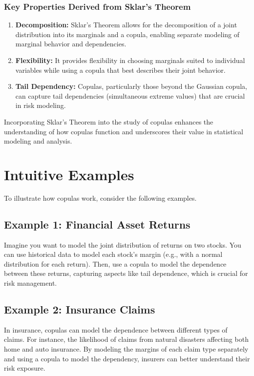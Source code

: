 \documentclass{article}
\begin{document}
\subsubsection{Key Properties Derived from Sklar's Theorem}
\begin{enumerate}
    \item \textbf{Decomposition:} Sklar's Theorem allows for the decomposition of a joint distribution into its marginals and a copula, enabling separate modeling of marginal behavior and dependencies.
    \item \textbf{Flexibility:} It provides flexibility in choosing marginals suited to individual variables while using a copula that best describes their joint behavior.
    \item \textbf{Tail Dependency:} Copulas, particularly those beyond the Gaussian copula, can capture tail dependencies (simultaneous extreme values) that are crucial in risk modeling.
\end{enumerate}

Incorporating Sklar's Theorem into the study of copulas enhances the understanding of how copulas function and underscores their value in statistical modeling and analysis.

\section{Intuitive Examples}
To illustrate how copulas work, consider the following examples.

\subsection{Example 1: Financial Asset Returns}
Imagine you want to model the joint distribution of returns on two stocks. You can use historical data to model each stock's margin (e.g., with a normal distribution for each return). Then, use a copula to model the dependence between these returns, capturing aspects like tail dependence, which is crucial for risk management.

\subsection{Example 2: Insurance Claims}
In insurance, copulas can model the dependence between different types of claims. For instance, the likelihood of claims from natural disasters affecting both home and auto insurance. By modeling the margins of each claim type separately and using a copula to model the dependency, insurers can better understand their risk exposure.
\end{document}

